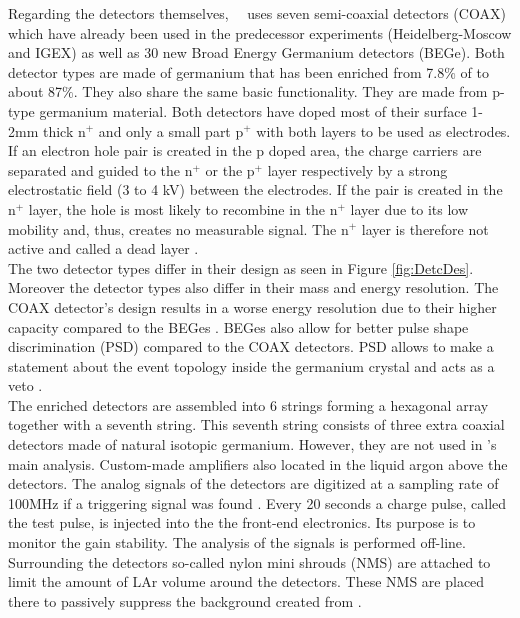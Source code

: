 \documentclass[encoding=utf8,british]{tumphthesis}
\begin{document}
Regarding the detectors themselves, \gerda\ \PII\ uses seven semi-coaxial detectors (COAX) which have already been used in the predecessor experiments (Heidelberg-Moscow and IGEX) as well as 30 new Broad Energy Germanium detectors (BEGe).
Both detector types are made of germanium that has been enriched from 7.8$\%$ of  to about 87$\%$.
They also share the same basic functionality.
They are made from p-type germanium material.
Both detectors have doped most of their surface 1-2mm thick n$^+$ and only a small part p$^+$ with both layers to be used as electrodes.
If an electron hole pair is created in the p doped area, the charge carriers are separated and guided to the n$^+$ or the p$^+$ layer respectively by a strong electrostatic field (3 to 4 kV) between the electrodes.
If the pair is created in the n$^+$ layer, the hole is most likely to recombine in the n$^+$ layer due to its low mobility and, thus, creates no measurable signal.
The n$^+$ layer is therefore not active and called a dead layer \cite{agostini_production_2015}.
\\

The two detector types differ in their design as seen in Figure \ref{fig:DetcDes}.
Moreover the detector types also differ in their mass and energy resolution.
The COAX detector's design results in a worse energy resolution due to their higher capacity compared to the BEGes \cite{agostini_production_2015}.
BEGes also allow for better pulse shape discrimination (PSD) compared to the COAX detectors.
PSD allows to make a statement about the event topology inside the germanium crystal and acts as a veto \cite{agostini_pulse_2013}.
\\

The enriched detectors are assembled into 6 strings forming a hexagonal array together with a seventh string.
This seventh string consists of three extra coaxial detectors made of natural isotopic germanium.
However, they are not used in \gerda's main analysis.
Custom-made amplifiers also located in the liquid argon above the detectors.
The analog signals of the detectors are digitized at a sampling rate of 100MHz if a triggering signal was found \cite{riboldi_cryogenic_2015}.
Every 20 seconds a charge pulse, called the test pulse, is injected into the the front-end electronics.
Its purpose is to monitor the gain stability.
The analysis of the signals is performed off-line.
Surrounding the detectors so-called nylon mini shrouds (NMS) are attached to limit the amount of LAr volume around the detectors.
These NMS are placed there to passively suppress the background created from  \cite{agostini_background_2014}.
\end{document}
